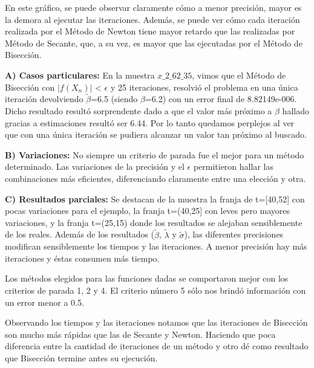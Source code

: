 \documentclass[10pt, a4paper]{article}
\begin{document}
En este gr\'afico, se puede observar claramente c\'omo a menor precisi\'on, mayor es la demora al ejecutar las iteraciones. Adem\'as, se puede ver c\'omo cada iteraci\'on realizada por el M\'etodo de Newton tiene mayor retardo que las realizadas por M\'etodo de Secante, que, a su vez, es mayor que las ejecutadas por el M\'etodo de Bisecci\'on.\newline


\large{\textbf{A) Casos particulares:}}
\newline
En la muestra $x\_2\_62\_35$, vimos que el M\'etodo de Bisecci\'on con $|f(X_{n})|$ < $\epsilon$ y 25 iteraciones, resolvi\'o el problema en una \'unica iteraci\'on devolviendo $\tilde{\beta}$=6.5 (siendo $\beta$=6.2) con un error final de 8.82149e-006. Dicho resultado result\'o sorprendente dado a que el valor m\'as pr\'oximo a $\beta$ hallado gracias a estimaciones result\'o ser 6.44. Por lo tanto quedamos perplejos al ver que con una \'unica iteraci\'on se pudiera alcanzar un valor tan pr\'oximo al buscado.\newline

\large{\textbf{B) Variaciones:}}
\newline
No siempre un criterio de parada fue el mejor para un m\'etodo determinado. Las variaciones de la precisi\'on y el $\epsilon$ permitieron hallar las combinaciones m\'as eficientes, diferenciando claramente entre una elecci\'on y otra.\newline

\large{\textbf{C) Resultados parciales:}}
\newline
Se destacan de la muestra la franja de t=[40,52] con pocas variaciones para el ejemplo, la franja t=(40,25] con leves pero mayores variaciones, y la franja t=(25,15) donde los resultados se alejaban sensiblemente de los reales.\newline
Adem\'as de los resultados ($\tilde{\beta}$, $\tilde{\lambda}$ y $\tilde{\sigma}$), las diferentes precisiones modifican sensiblemente los tiempos y las iteraciones. A menor precisi\'on hay más iteraciones y \'estas consumen m\'as tiempo.\newline

Los m\'etodos elegidos para las funciones dadas se comportaron mejor con los criterios de parada 1, 2 y 4. El criterio n\'umero 5 s\'olo nos brind\'o informaci\'on con un error menor a 0.5.\newline

Observando los tiempos y las iteraciones notamos que las iteraciones de Bisecci\'on son mucho m\'as r\'apidas que las de Secante y Newton. Haciendo que poca diferencia entre la cantidad de iteraciones de un m\'etodo y otro d\'e como resultado que Bisecci\'on termine antes su ejecuci\'on.\newline
\end{document}
